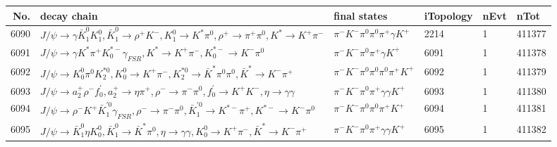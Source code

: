 \begin{table}[htbp] 
\begin{center}
\begin{small}
\begin{tabular}{rlllll}\hline\hline
 No. & decay chain & final states &  iTopology & nEvt & nTot \\\hline
6090&$J/\psi       \rightarrow \gamma       \bar{K}_1^{0} K_1^{0}        , \bar{K}_1^{0}  \rightarrow \rho^{+}      K^{-}          , K_1^{0}         \rightarrow K^{*}          \pi^{0}        , \rho^{+}       \rightarrow \pi^{+}        \pi^{0}        , K^{*}           \rightarrow K^{+}          \pi^{-}        $&$\pi^{-}        K^{-}          \pi^{0}        \pi^{0}        \pi^{+}        \gamma       K^{+}          $& 2214&    1&411377\\
6091&$J/\psi       \rightarrow \gamma       K^{*}          \pi^{+}        K_{0}^{*-}     \gamma_{FSR} , K^{*}           \rightarrow K^{+}          \pi^{-}        , K_{0}^{*-}      \rightarrow K^{-}          \pi^{0}        $&$\pi^{-}        K^{-}          \pi^{0}        \pi^{+}        \gamma       K^{+}          $& 6091&    1&411378\\
6092&$J/\psi       \rightarrow K_0^{0}        \pi^{0}        K_2^{*0}       , K_0^{0}         \rightarrow K^{+}          \pi^{-}        , K_2^{*0}        \rightarrow \bar{K}^{*}   \pi^{0}        \pi^{0}        , \bar{K}^{*}    \rightarrow K^{-}          \pi^{+}        $&$\pi^{-}        K^{-}          \pi^{0}        \pi^{0}        \pi^{0}        \pi^{+}        K^{+}          $& 6092&    1&411379\\
6093&$J/\psi       \rightarrow a_{2}^{+}      \rho^{-}      f^{'}_{0}     , a_{2}^{+}       \rightarrow \eta          \pi^{+}        , \rho^{-}       \rightarrow \pi^{-}        \pi^{0}        , f^{'}_{0}      \rightarrow K^{+}          K^{-}          , \eta           \rightarrow \gamma       \gamma       $&$\pi^{-}        K^{-}          \pi^{0}        \pi^{+}        \gamma       \gamma       K^{+}          $& 6093&    1&411380\\
6094&$J/\psi       \rightarrow \rho^{-}      K^{+}          \bar{K}_1^{'0}\gamma_{FSR} , \rho^{-}       \rightarrow \pi^{-}        \pi^{0}        , \bar{K}_1^{'0} \rightarrow K^{*-}         \pi^{+}        , K^{*-}          \rightarrow K^{-}          \pi^{0}        $&$\pi^{-}        K^{-}          \pi^{0}        \pi^{0}        \pi^{+}        K^{+}          $& 6094&    1&411381\\
6095&$J/\psi       \rightarrow \bar{K}_1^{0} \eta          K_0^{0}        , \bar{K}_1^{0}  \rightarrow \bar{K}^{*}   \pi^{0}        , \eta           \rightarrow \gamma       \gamma       , K_0^{0}         \rightarrow K^{+}          \pi^{-}        , \bar{K}^{*}    \rightarrow K^{-}          \pi^{+}        $&$\pi^{-}        K^{-}          \pi^{0}        \pi^{+}        \gamma       \gamma       K^{+}          $& 6095&    1&411382\\

\end{tabular}
\end{small}
\end{center}
\end{table}
